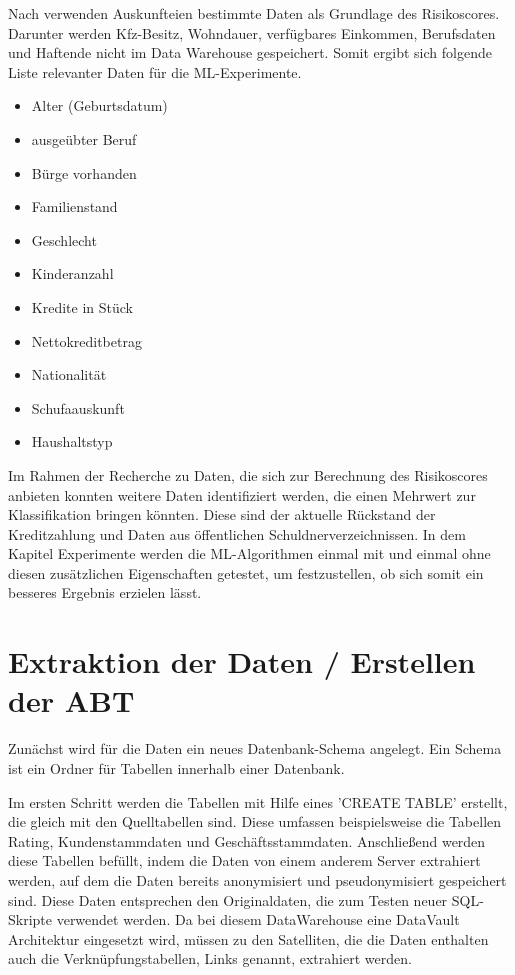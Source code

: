 
Nach \cite{petri2005} verwenden Auskunfteien bestimmte Daten als Grundlage des Risikoscores. 
Darunter werden Kfz-Besitz, Wohndauer, verfügbares Einkommen, Berufsdaten und Haftende nicht im Data Warehouse gespeichert. 
Somit ergibt sich folgende Liste relevanter Daten für die ML-Experimente. 

\begin{itemize}
 \item Alter (Geburtsdatum)
 \item ausgeübter Beruf
 \item Bürge vorhanden
 \item Familienstand
 \item Geschlecht
 \item Kinderanzahl
 \item Kredite in Stück 
 \item Nettokreditbetrag 
 \item Nationalität
 \item Schufaauskunft
 \item Haushaltstyp
\end{itemize}


Im Rahmen der Recherche zu Daten, die sich zur Berechnung des Risikoscores anbieten konnten weitere Daten identifiziert werden, die einen Mehrwert zur Klassifikation bringen könnten. 
Diese sind der aktuelle Rückstand der Kreditzahlung und Daten aus öffentlichen Schuldnerverzeichnissen.
In dem Kapitel Experimente werden die ML-Algorithmen einmal mit und einmal ohne diesen zusätzlichen Eigenschaften getestet, um festzustellen, ob sich somit ein besseres Ergebnis erzielen lässt. 


\section{Extraktion der Daten / Erstellen der ABT}
Zunächst wird für die Daten ein neues Datenbank-Schema angelegt.
Ein Schema ist ein Ordner für Tabellen innerhalb einer Datenbank.

Im ersten Schritt werden die Tabellen mit Hilfe eines 'CREATE TABLE' erstellt, die gleich mit den Quelltabellen sind. 
Diese umfassen beispielsweise die Tabellen Rating, Kundenstammdaten und Geschäftsstammdaten. 
Anschließend werden diese Tabellen befüllt, indem die Daten von einem anderem Server extrahiert werden, auf dem die Daten bereits anonymisiert und pseudonymisiert gespeichert sind. 
Diese Daten entsprechen den Originaldaten, die zum Testen neuer SQL-Skripte verwendet werden. 
Da bei diesem DataWarehouse eine DataVault Architektur eingesetzt wird, müssen zu den Satelliten, die die Daten enthalten auch die Verknüpfungstabellen, Links genannt, extrahiert werden.  

